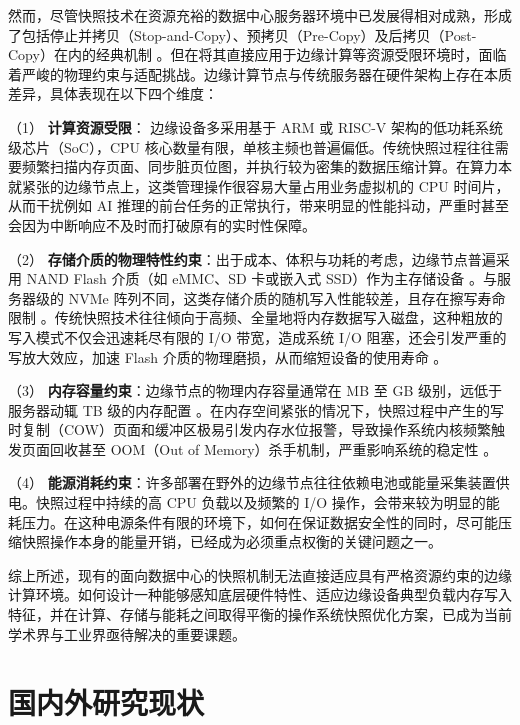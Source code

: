 然而，尽管快照技术在资源充裕的数据中心服务器环境中已发展得相对成熟，形成了包括停止并拷贝（Stop-and-Copy）、预拷贝（Pre-Copy）及后拷贝（Post-Copy）在内的经典机制 \cite{clark2005live, hines2009post}。但在将其直接应用于边缘计算等资源受限环境时，面临着严峻的物理约束与适配挑战\cite{shi2019memory, zhong2016flic}。边缘计算节点与传统服务器在硬件架构上存在本质差异，具体表现在以下四个维度：

（1） \textbf{计算资源受限}： 边缘设备多采用基于 ARM 或 RISC-V 架构的低功耗系统级芯片（SoC），CPU 核心数量有限，单核主频也普遍偏低。传统快照过程往往需要频繁扫描内存页面、同步脏页位图，并执行较为密集的数据压缩计算。在算力本就紧张的边缘节点上，这类管理操作很容易大量占用业务虚拟机的 CPU 时间片，从而干扰例如 AI 推理的前台任务的正常执行，带来明显的性能抖动，严重时甚至会因为中断响应不及时而打破原有的实时性保障。

（2） \textbf{存储介质的物理特性约束}：出于成本、体积与功耗的考虑，边缘节点普遍采用 NAND Flash 介质（如 eMMC、SD 卡或嵌入式 SSD）作为主存储设备 \cite{gobieski2019intelligence, zhang2023review}。与服务器级的 NVMe 阵列不同，这类存储介质的随机写入性能较差，且存在擦写寿命限制 \cite{zhong2016flic, shi2022memory}。传统快照技术往往倾向于高频、全量地将内存数据写入磁盘，这种粗放的写入模式不仅会迅速耗尽有限的 I/O 带宽，造成系统 I/O 阻塞，还会引发严重的写放大效应，加速 Flash 介质的物理磨损，从而缩短设备的使用寿命 。

（3） \textbf{内存容量约束}：边缘节点的物理内存容量通常在 MB 至 GB 级别，远低于服务器动辄 TB 级的内存配置 。在内存空间紧张的情况下，快照过程中产生的写时复制（COW）页面和缓冲区极易引发内存水位报警，导致操作系统内核频繁触发页面回收甚至 OOM（Out of Memory）杀手机制，严重影响系统的稳定性 。

（4） \textbf{能源消耗约束}：许多部署在野外的边缘节点往往依赖电池或能量采集装置供电。快照过程中持续的高 CPU 负载以及频繁的 I/O 操作，会带来较为明显的能耗压力。在这种电源条件有限的环境下，如何在保证数据安全性的同时，尽可能压缩快照操作本身的能量开销，已经成为必须重点权衡的关键问题之一。

综上所述，现有的面向数据中心的快照机制无法直接适应具有严格资源约束的边缘计算环境。如何设计一种能够感知底层硬件特性、适应边缘设备典型负载内存写入特征，并在计算、存储与能耗之间取得平衡的操作系统快照优化方案，已成为当前学术界与工业界亟待解决的重要课题。

\section{国内外研究现状}

